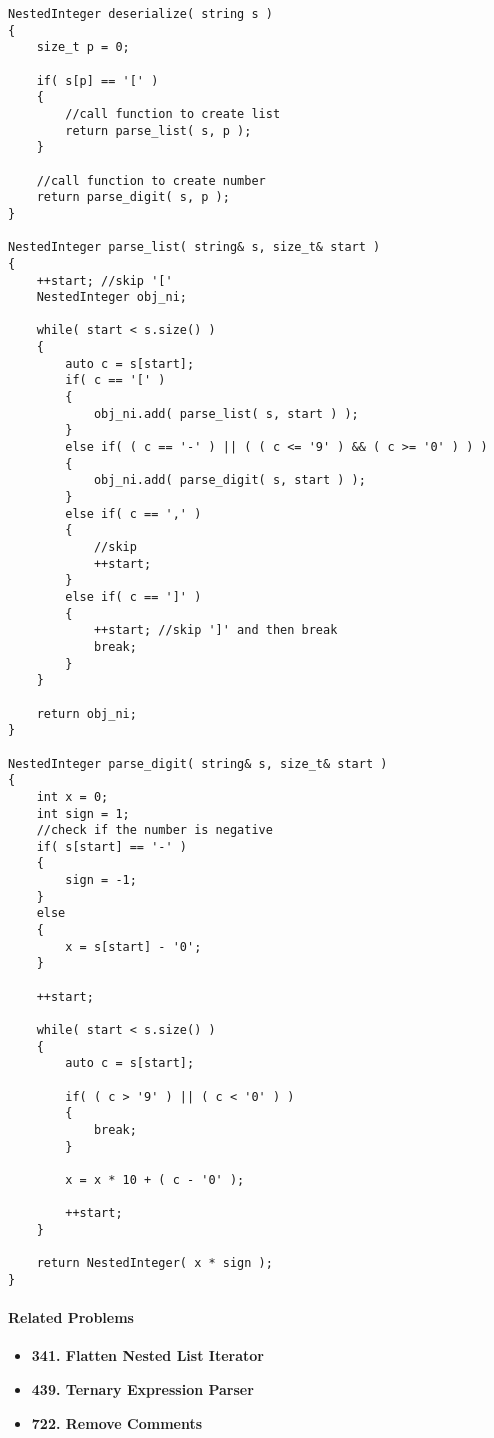 \begin{lstlisting}[style=customc, caption={Recursion}]
NestedInteger deserialize( string s )
{
    size_t p = 0;

    if( s[p] == '[' )
    {
        //call function to create list
        return parse_list( s, p );
    }

    //call function to create number
    return parse_digit( s, p );
}

NestedInteger parse_list( string& s, size_t& start )
{
    ++start; //skip '['
    NestedInteger obj_ni;

    while( start < s.size() )
    {
        auto c = s[start];
        if( c == '[' )
        {
            obj_ni.add( parse_list( s, start ) );
        }
        else if( ( c == '-' ) || ( ( c <= '9' ) && ( c >= '0' ) ) )
        {
            obj_ni.add( parse_digit( s, start ) );
        }
        else if( c == ',' )
        {
            //skip
            ++start;
        }
        else if( c == ']' )
        {
            ++start; //skip ']' and then break
            break;
        }
    }

    return obj_ni;
}

NestedInteger parse_digit( string& s, size_t& start )
{
    int x = 0;
    int sign = 1;
    //check if the number is negative
    if( s[start] == '-' )
    {
        sign = -1;
    }
    else
    {
        x = s[start] - '0';
    }

    ++start;

    while( start < s.size() )
    {
        auto c = s[start];

        if( ( c > '9' ) || ( c < '0' ) )
        {
            break;
        }

        x = x * 10 + ( c - '0' );

        ++start;
    }

    return NestedInteger( x * sign );
}
\end{lstlisting}

\paragraph{Related Problems}
\begin{itemize}
\item \textbf{341. Flatten Nested List Iterator}
\item \textbf{439. Ternary Expression Parser}
\item \textbf{722. Remove Comments}
\end{itemize}
